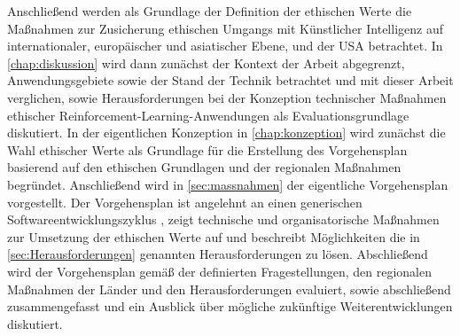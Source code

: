 Anschließend werden als Grundlage der Definition der ethischen Werte die Maßnahmen zur Zusicherung ethischen Umgangs mit Künstlicher Intelligenz auf internationaler, europäischer und asiatischer Ebene, und der USA betrachtet. 
In \autoref{chap:diskussion} wird dann zunächst der Kontext der Arbeit abgegrenzt, Anwendungsgebiete sowie der Stand der Technik betrachtet und mit dieser Arbeit verglichen, sowie Herausforderungen bei der Konzeption technischer Maßnahmen ethischer Reinforcement-Learning-Anwendungen als Evaluationsgrundlage diskutiert.
In der eigentlichen Konzeption in \autoref{chap:konzeption} wird zunächst die Wahl ethischer Werte als Grundlage für die Erstellung des Vorgehensplan basierend auf den ethischen Grundlagen und der regionalen Maßnahmen begründet.
Anschließend wird in \autoref{sec:massnahmen} der eigentliche Vorgehensplan vorgestellt. 
Der Vorgehensplan ist angelehnt an einen generischen Softwareentwicklungszyklus \cite[S. 64]{broy2013}, zeigt technische und organisatorische Maßnahmen zur Umsetzung der ethischen Werte auf und beschreibt Möglichkeiten die in \autoref{sec:Herausforderungen} genannten Herausforderungen zu lösen.
Abschließend wird der Vorgehensplan gemäß der definierten Fragestellungen, den regionalen Maßnahmen der Länder und den Herausforderungen evaluiert, sowie abschließend zusammengefasst und ein Ausblick über mögliche zukünftige Weiterentwicklungen diskutiert.
